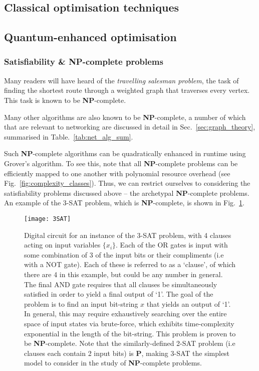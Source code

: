 
\subsection{Classical optimisation techniques}

\subsection{Quantum-enhanced optimisation}

\subsubsection{Satisfiability \& \textbf{NP}-complete problems}

Many readers will have heard of the \textit{travelling salesman problem}, the task of finding the shortest route through a weighted graph that traverses every vertex. This task is known to be \textbf{NP}-complete.

Many other algorithms are also known to be \textbf{NP}-complete, a number of which that are relevant to networking are discussed in detail in Sec.~\ref{sec:graph_theory}, summarised in Table.~\ref{tab:net_alg_sum}.

Such \textbf{NP}-complete algorithms can be quadratically enhanced in runtime using Grover's algorithm. To see this, note that all \textbf{NP}-complete problems can be efficiently mapped to one another with polynomial resource overhead (see Fig.~\ref{fig:complexity_classes}). Thus, we can restrict ourselves to considering the satisfiability problems discussed above -- the archetypal \textbf{NP}-complete problems. An example of the 3-\textsc{SAT} problem, which is \textbf{NP}-complete, is shown in Fig.~\ref{fig:3SAT}.

\begin{figure}[!htb]
\texttt{[image: 3SAT]}
\caption{Digital circuit for an instance of the 3-\textsc{SAT} problem, with 4 clauses acting on input variables $\{x_i\}$. Each of the OR gates is input with some combination of 3 of the input bits or their compliments (i.e with a NOT gate). Each of these is referred to as a `clause', of which there are 4 in this example, but could be any number in general. The final AND gate requires that all clauses be simultaneously satisfied in order to yield a final output of `1'. The goal of the problem is to find an input bit-string $x$ that yields an output of `1'. In general, this may require exhaustively searching over the entire space of input states via brute-force, which exhibits time-complexity exponential in the length of the bit-string. This problem is proven to be \textbf{NP}-complete. Note that the similarly-defined 2-\textsc{SAT} problem (i.e clauses each contain 2 input bits) is \textbf{P}, making 3-\textsc{SAT} the simplest model to consider in the study of \textbf{NP}-complete problems.} \label{fig:3SAT}	
\end{figure}

